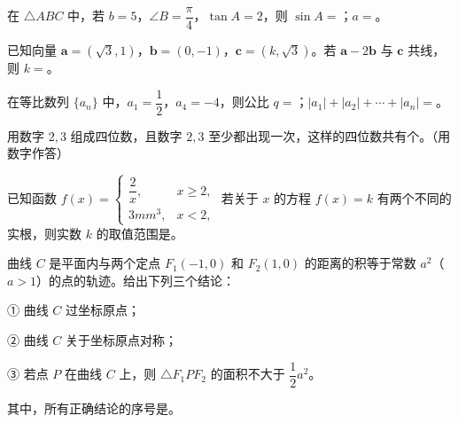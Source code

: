 \begin{question}
在 $\triangle ABC$ 中，若 $b=5$，$\angle B=\dfrac{\pi}{4}$，$\tan A=2$，则 $\sin A=$\gkblank{}；$a=$\gkblank{}。

\end{question}
\begin{question}
已知向量 $\boldsymbol a=(\sqrt3,1)$，$\boldsymbol b=(0,-1)$，$\boldsymbol c=(k,\sqrt3)$。若 $\boldsymbol a-2\boldsymbol b$ 与 $\boldsymbol c$ 共线，则 $k=$\gkblank{}。

\end{question}
\begin{question}
在等比数列 $\{a_n\}$ 中，$a_1=\dfrac12$，$a_4=-4$，则公比 $q=$\gkblank{}；$|a_1|+|a_2|+\cdots+|a_n|=$\gkblank{}。

\end{question}
\begin{question}
用数字 $2,3$ 组成四位数，且数字 $2,3$ 至少都出现一次，这样的四位数共有\gkblank{}个。（用数字作答）

\end{question}
\begin{question}
已知函数 $f(x)=\begin{cases}\dfrac2x,&x\geqslant 2,\\3mm^3,&x<2,\end{cases}$ 若关于 $x$ 的方程 $f(x)=k$ 有两个不同的实根，则实数 $k$ 的取值范围是\gkblank{}。

\end{question}
\begin{question}
曲线 $C$ 是平面内与两个定点 $F_1(-1,0)$ 和 $F_2(1,0)$ 的距离的积等于常数 $a^2$（$a>1$）的点的轨迹。给出下列三个结论：

① 曲线 $C$ 过坐标原点；

② 曲线 $C$ 关于坐标原点对称；

③ 若点 $P$ 在曲线 $C$ 上，则 $\triangle F_1PF_2$ 的面积不大于 $\dfrac12a^2$。

其中，所有正确结论的序号是\gkblank{}。

\end{question}

